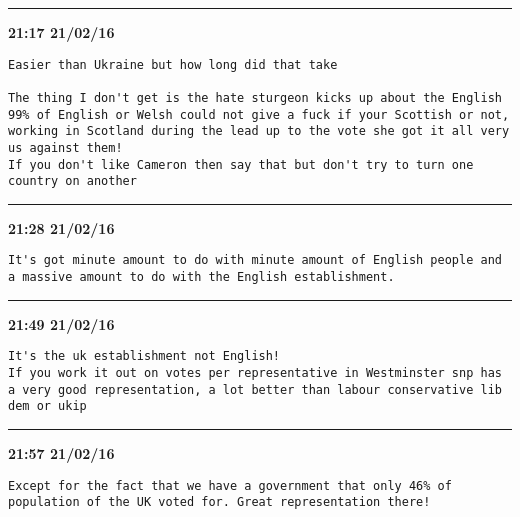 \hrule%

\begin{adjustwidth}{4cm}{0cm}
\footnotesize \textbf{21:17 21/02/16}

\begin{lstlisting}[breaklines, breakatwhitespace, basicstyle=\small, frame=leftline]
Easier than Ukraine but how long did that take

The thing I don't get is the hate sturgeon kicks up about the English
99% of English or Welsh could not give a fuck if your Scottish or not, working in Scotland during the lead up to the vote she got it all very us against them! 
If you don't like Cameron then say that but don't try to turn one country on another
\end{lstlisting}
\end{adjustwidth}

\hrule%

\begin{adjustwidth}{6cm}{0cm}
\footnotesize \textbf{21:28 21/02/16}

\begin{lstlisting}[breaklines, breakatwhitespace, basicstyle=\small, frame=leftline]
It's got minute amount to do with minute amount of English people and a massive amount to do with the English establishment. 
\end{lstlisting}
\end{adjustwidth}

\hrule%

\begin{adjustwidth}{8cm}{0cm}
\footnotesize \textbf{21:49 21/02/16}

\begin{lstlisting}[breaklines, breakatwhitespace, basicstyle=\small, frame=leftline]
It's the uk establishment not English!
If you work it out on votes per representative in Westminster snp has a very good representation, a lot better than labour conservative lib dem or ukip

\end{lstlisting}
\end{adjustwidth}

\hrule%

\begin{adjustwidth}{10cm}{0cm}
\footnotesize \textbf{21:57 21/02/16}

\begin{lstlisting}[breaklines, breakatwhitespace, basicstyle=\small, frame=leftline]
Except for the fact that we have a government that only 46% of population of the UK voted for. Great representation there!
\end{lstlisting}
\end{adjustwidth}

